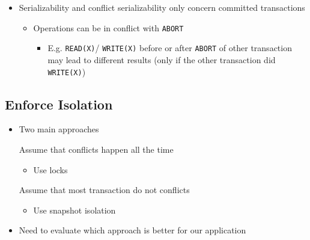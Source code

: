 \begin{itemize}
\begin{itemize}
        \end{itemize}
    \item Serializability and conflict serializability only concern committed transactions
        \begin{itemize}
            \item Operations can be in conflict with \verb+ABORT+
                \begin{itemize}
                    \item E.g. \verb+READ(X)+/ \verb+WRITE(X)+ before or after \verb+ABORT+ of other transaction may lead to different results (only if the other transaction did \verb+WRITE(X)+)
                \end{itemize}
        \end{itemize}
\end{itemize}

\subsection{Enforce Isolation}
\begin{itemize}
     Only allow schedules that are conflict serializable
    \item Two main approaches
        \begin{itemize}
             Assume that conflicts happen all the time
                \begin{itemize}
                    \item Use locks
                \end{itemize}
             Assume that most transaction do not conflicts
                \begin{itemize}
                    \item Use snapshot isolation
                \end{itemize}
        \end{itemize}
    \item Need to evaluate which approach is better for our application
\end{itemize}

